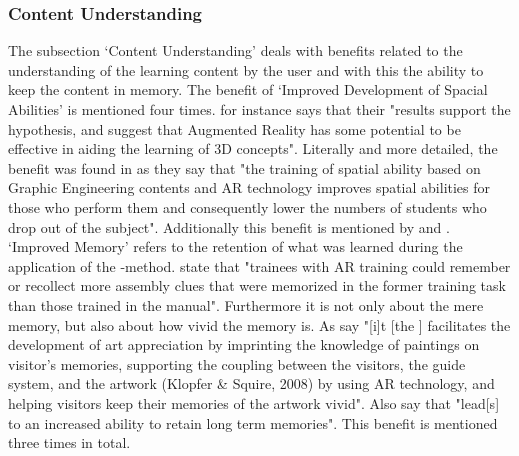 \subsubsection{Content Understanding}
The subsection ‘Content Understanding’ deals with benefits related to the understanding of the learning content by the user and with this the ability to keep the content in memory.
The benefit of ‘Improved Development of Spacial Abilities’ is mentioned four times. \cite{Dunser.2012} for instance says that their "results support the hypothesis, and suggest that Augmented Reality has some potential to be effective 
in aiding the learning of 3D concepts"\autocite[112]{Dunser.2012}. Literally and more detailed, the benefit was found in \cite{MartinGutierrez.2011} as they say that "the training of spatial ability based on 
Graphic Engineering contents and AR technology improves spatial abilities for those who perform them and consequently lower the numbers of students who drop out of the subject"\autocite[5]{MartinGutierrez.2011}.
Additionally this benefit is mentioned by \cite{MartinGutierrez.2013} and \cite{Chen.2008}.\autocite[cf.][4]{MartinGutierrez.2013}\mulcit\autocite[cf.][5]{Chen.2008}
‘Improved Memory' refers to the retention of what was learned during the application of the \ARns-method. \cite{Hou.2013} state that "trainees with AR training could remember or recollect more assembly 
clues that were memorized in the former training task than those trained in the manual"\autocite[450]{Hou.2013}. Furthermore it is not only about the mere memory, but also about how vivid the memory is. As \cite{Chang.2014}
say "[i]t [the \AR \app] facilitates the development of art appreciation by imprinting the knowledge of paintings on visitor's memories, supporting the coupling between the visitors, the guide system, and the artwork (Klopfer \& Squire, 2008) by using 
AR technology, and helping visitors keep their memories of the artwork vivid"\autocite[193]{Chang.2014}. Also \cite{Macchiarella.2005} say that \AR "lead[s] to an increased ability to retain long term memories"\autocite[4]{Macchiarella.2005}.
This benefit is mentioned three times in total.

% 
